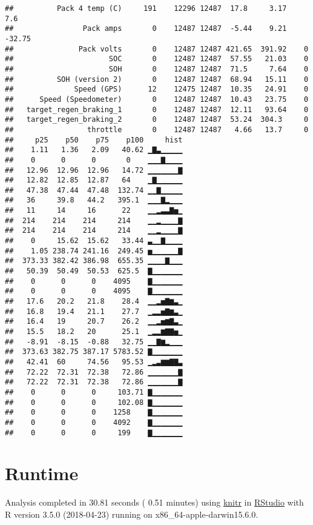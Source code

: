 \documentclass[]{article}
\begin{document}
\begin{verbatim}
##          Pack 4 temp (C)     191    12296 12487  17.8     3.17    7.6 
##                Pack amps       0    12487 12487  -5.44    9.21  -32.75
##               Pack volts       0    12487 12487 421.65  391.92    0   
##                      SOC       0    12487 12487  57.55   21.03    0   
##                      SOH       0    12487 12487  71.5     7.64    0   
##          SOH (version 2)       0    12487 12487  68.94   15.11    0   
##              Speed (GPS)      12    12475 12487  10.35   24.91    0   
##      Speed (Speedometer)       0    12487 12487  10.43   23.75    0   
##   target_regen_braking_1       0    12487 12487  12.11   93.64    0   
##   target_regen_braking_2       0    12487 12487  53.24  304.3     0   
##                 throttle       0    12487 12487   4.66   13.7     0   
##     p25    p50    p75    p100     hist
##    1.11   1.36   2.09   40.62 ▁▇▃▁▁▁▁▁
##    0      0      0       0    ▁▁▁▇▁▁▁▁
##   12.96  12.96  12.96   14.72 ▁▁▁▁▁▁▁▇
##   12.82  12.85  12.87   64    ▁▇▁▁▁▁▁▁
##   47.38  47.44  47.48  132.74 ▁▁▇▁▁▁▁▁
##   36     39.8   44.2   395.1  ▁▁▁▇▂▁▁▁
##   11     14     16      22    ▁▁▂▃▃▇▅▁
##  214    214    214     214    ▁▁▂▁▁▁▁▇
##  214    214    214     214    ▁▁▂▁▁▁▁▇
##    0     15.62  15.62   33.44 ▃▁▁▇▁▁▁▁
##    1.05 238.74 241.16  249.45 ▅▁▁▁▁▁▁▇
##  373.33 382.42 386.98  655.35 ▁▁▁▁▇▁▁▁
##   50.39  50.49  50.53  625.5  ▇▁▁▁▁▁▁▁
##    0      0      0    4095    ▇▁▁▁▁▁▁▁
##    0      0      0    4095    ▇▁▁▁▁▁▁▁
##   17.6   20.2   21.8    28.4  ▁▁▂▅▇▆▃▁
##   16.8   19.4   21.1    27.7  ▁▂▂▅▇▆▃▁
##   16.4   19     20.7    26.2  ▁▁▂▅▆▇▃▁
##   15.5   18.2   20      25.1  ▁▂▂▆▇▇▅▁
##   -8.91  -8.15  -0.88   32.75 ▁▁▇▆▂▁▁▁
##  373.63 382.75 387.17 5783.52 ▇▁▁▁▁▁▁▁
##   42.41  60     74.56   95.53 ▁▂▃▆▆▇▇▃
##   72.22  72.31  72.38   72.86 ▁▁▁▁▁▁▁▇
##   72.22  72.31  72.38   72.86 ▁▁▁▁▁▁▁▇
##    0      0      0     103.71 ▇▁▁▁▁▁▁▁
##    0      0      0     102.08 ▇▁▁▁▁▁▁▁
##    0      0      0    1258    ▇▁▁▁▁▁▁▁
##    0      0      0    4092    ▇▁▁▁▁▁▁▁
##    0      0      0     199    ▇▁▁▁▁▁▁▁
\end{verbatim}

\section{Runtime}\label{runtime}

Analysis completed in 30.81 seconds ( 0.51 minutes) using
\href{https://cran.r-project.org/package=knitr}{knitr} in
\href{http://www.rstudio.com}{RStudio} with R version 3.5.0 (2018-04-23)
running on x86\_64-apple-darwin15.6.0.
\end{document}
